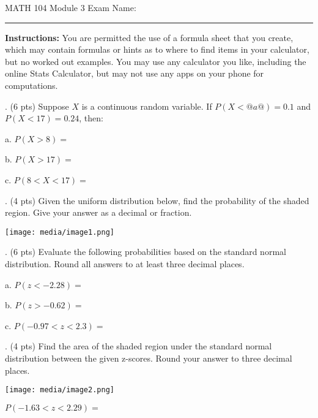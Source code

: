 \documentclass{article}
\newcommand{\newquestion}{\vspace{4mm} \noindent}
\begin{document}
\pagestyle{empty}

\noindent MATH 104 Module 3 Exam \hfill Name: \rule{6cm}{0.15mm} \vspace{2mm}

\begin{instructionbox}
\textbf{Instructions:} You are permitted the use of a formula sheet that you create, which may contain formulas or hints as to where to find items in your calculator, but no worked out examples. You may use any calculator you like, including the online Stats Calculator, but may not use any apps on your phone for computations.
\end{instructionbox}

\raggedright

\newquestion 
1. (6 pts) Suppose $X$ is a continuous random variable. If $P(X < @a@) = 0.1$ and
$P(X < 17) = 0.24$, then:\vspace{4mm}

a. $P(X > 8) =$ \vspace{4mm}

b. $P(X > 17) =$ \vspace{4mm}

c. $P(8 < X < 17) =$ \vspace{4mm}

\newquestion
2. (4 pts) Given the uniform distribution below, find the probability of the shaded
region. Give your answer as a decimal or fraction.\vspace{4mm}
\begin{center}
	\texttt{[image: media/image1.png]}
\end{center}

\newquestion
3. (6 pts) Evaluate the following probabilities based on the standard normal
distribution. Round all answers to at least three decimal places.\vspace{4mm}

a. \(P(z < - 2.28) =\) \vspace{4mm}

b. \(P(z > - 0.62) =\) \vspace{4mm}

c. \(P( - 0.97 < z < 2.3) =\) \vspace{4mm}

\newquestion
4. (4 pts) Find the area of the shaded region under the standard normal distribution between the given z-scores. Round your answer to three decimal places. \vspace{4mm}
\begin{center}
	\texttt{[image: media/image2.png]}\\
\end{center}
\(P( - 1.63 < z < 2.29) =\)
\end{document}
